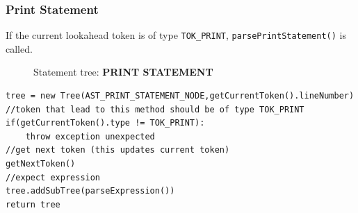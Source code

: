 \subsubsection{Print Statement}
\label{sec:print statement subtree}
If the current lookahead token is of type \verb!TOK_PRINT!, \verb!parsePrintStatement()! is called. 
\begin{figure}[H]
    \centering
    \caption{Statement tree: \textbf{PRINT STATEMENT}}
    \label{fig:Print statemment tree}
\end{figure}

\begin{lstlisting}[caption=PSEUDOCODE for building a print statement tree (\emph{printStatement()})]
tree = new Tree(AST_PRINT_STATEMENT_NODE,getCurrentToken().lineNumber)
//token that lead to this method should be of type TOK_PRINT
if(getCurrentToken().type != TOK_PRINT):
    throw exception unexpected 
//get next token (this updates current token)
getNextToken()
//expect expression
tree.addSubTree(parseExpression())
return tree
\end{lstlisting}
